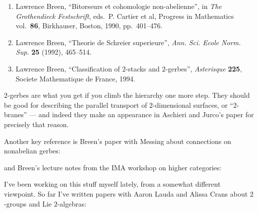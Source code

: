 \documentclass{article}
\def\tightlist{}
\renewcommand{\texttt}[1]{%
  \begingroup
  \ttfamily
  \begingroup\lccode`~=`/\lowercase{\endgroup\def~}{/\discretionary{}{}{}}%
  \begingroup\lccode`~=`[\lowercase{\endgroup\def~}{[\discretionary{}{}{}}%
  \begingroup\lccode`~=`.\lowercase{\endgroup\def~}{.\discretionary{}{}{}}%
  \catcode`/=\active\catcode`[=\active\catcode`.=\active
  \scantokens{#1\noexpand}%
  \endgroup
}
\begin{document}
\begin{enumerate}
\def\labelenumi{\arabic{enumi})}
\setcounter{enumi}{5}
\item
  Lawrence Breen, ``Bitorseurs et cohomologie non-abelienne'', in
  \emph{The Grothendieck Festschrift}, eds.~P. Cartier et al, Progress
  in Mathematics vol.~\textbf{86}, Birkhauser, Boston, 1990,
  pp.~401--476.
\item
  Lawrence Breen, ``Theorie de Schreier superieure'', \emph{Ann. Sci.
  Ecole Norm. Sup.} \textbf{25} (1992), 465--514.
\item
  Lawrence Breen, ``Classification of \(2\)-stacks and \(2\)-gerbes'',
  \emph{Asterisque} \textbf{225}, Societe Mathematique de France, 1994.
\end{enumerate}

\(2\)-gerbes are what you get if you climb the hierarchy one more step.
They should be good for describing the parallel transport of
\(2\)-dimensional surfaces, or ``\(2\)-branes'' --- and indeed they make
an appearance in Aschieri and Jurco's paper for precisely that reason.

Another key reference is Breen's paper with Messing about connections on
nonabelian gerbes:


and Breen's lecture notes from the IMA workshop on higher categories:


I've been working on this stuff myself lately, from a somewhat different
viewpoint. So far I've written papers with Aaron Lauda and Alissa Crans
about \(2\)-groups and Lie \(2\)-algebras:
\end{document}
